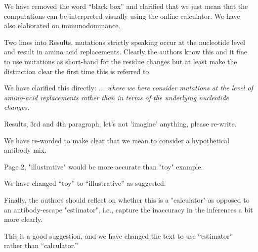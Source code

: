 \documentclass[11pt, oneside]{article}   	%
\newcommand{\response}[1]{{\color{black}#1}}
\begin{document}
\response{We have removed the word ``black box'' and clarified that we just mean that the computations can be interpreted visually using the online calculator. We have also elaborated on immunodominance.}

Two lines into Results, mutations strictly speaking occur at the nucleotide level and result in amino acid replacements. Clearly the authors know this and it fine to use mutations as short-hand for the residue changes but at least make the distinction clear the first time this is referred to.

\response{We have clarified this directly: \emph{... where we here consider mutations at the level of amino-acid replacements rather than in terms of the underlying nucleotide changes.}}

Results, 3rd and 4th paragraph, let's not 'imagine' anything, please re-write.

\response{We have re-worded to make clear that we mean to consider a hypothetical antibody mix.}

Page 2, "illustrative" would be more accurate than "toy" example.

\response{We have changed ``toy'' to ``illustrative'' as suggested.}

Finally, the authors should reflect on whether this is a "calculator" as opposed to an antibody-escape "estimator", i.e., capture the inaccuracy in the inferences a bit more clearly.

\response{This is a good suggestion, and we have changed the text to use ``estimator'' rather than ``calculator.''}

\color{black}

{\small

}
\end{document}
